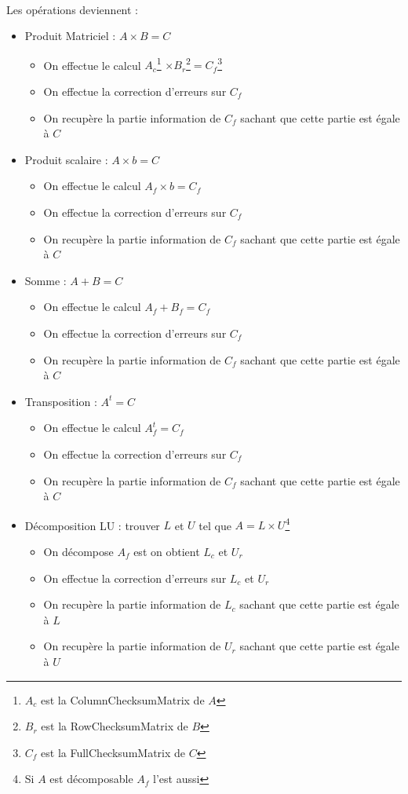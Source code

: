 \documentclass[a4paper,12pt]{report}
\begin{document}
\paragraph*{}
Les opérations deviennent :
\begin{itemize}
  \item Produit Matriciel : $ A \times B = C $
    \begin{itemize}
      \item  On effectue le calcul $ A_c $\footnote{$A_c$ est la ColumnChecksumMatrix de $A$}
	$\times B_r $\footnote{$B_r$ est la RowChecksumMatrix de $B$}$ = C_f $\footnote{$C_f$ est la FullChecksumMatrix de $C$}
      \item On effectue la correction d’erreurs sur $C_f$
      \item On recupère la partie information de $C_f$ sachant que cette partie est égale à $C$
    \end{itemize}
  \item Produit scalaire : $ A \times b = C $
    \begin{itemize}
      \item On effectue le calcul $ A_f \times b = C_f $
      \item On effectue la correction d’erreurs sur $C_f$
      \item On recupère la partie information de $C_f$ sachant que cette partie est égale à $C$
    \end{itemize}
 \item Somme : $ A + B = C $
    \begin{itemize}
      \item On effectue le calcul $ A_f + B_f = C_f $
      \item On effectue la correction d’erreurs sur $C_f$
      \item On recupère la partie information de $C_f$ sachant que cette partie est égale à $C$
    \end{itemize}
 \item Transposition : $ A^t = C $
    \begin{itemize}
      \item On effectue le calcul $A_f^t = C_f$
      \item On effectue la correction d’erreurs sur $C_f$
      \item On recupère la partie information de $C_f$ sachant que cette partie est égale à $C$
    \end{itemize}
 \item Décomposition LU : trouver $L$ et $U$ tel que $ A = L \times U $\footnote{Si $A$ est décomposable $A_f$ l'est aussi}
    \begin{itemize}
      \item On décompose $A_f$ est on obtient $L_c$ et $U_r$
      \item On effectue la correction d’erreurs sur $L_c$ et $U_r$
      \item On recupère la partie information de $L_c$ sachant que cette partie est égale à $L$
      \item On recupère la partie information de $U_r$ sachant que cette partie est égale à $U$
    \end{itemize}
\end{itemize}
\end{document}
